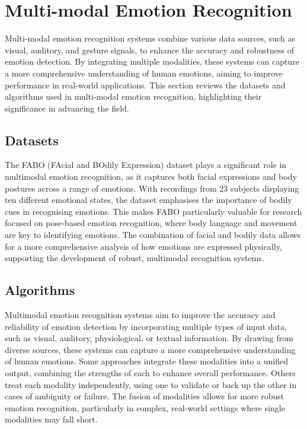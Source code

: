 \section{Multi-modal Emotion Recognition}

Multi-modal emotion recognition systems combine various data sources, such as visual, auditory, and gesture signals, to enhance the accuracy and robustness of emotion detection. By integrating multiple modalities, these systems can capture a more comprehensive understanding of human emotions, aiming to improve performance in real-world applications. This section reviews the datasets and algorithms used in multi-modal emotion recognition, highlighting their significance in advancing the field.

\subsection{Datasets}

The FABO (FAcial and BOdily Expression) dataset \cite{1699093} plays a significant role in multimodal emotion recognition, as it captures both facial expressions and body postures across a range of emotions. With recordings from 23 subjects displaying ten different emotional states, the dataset emphasises the importance of bodily cues in recognising emotions. This makes FABO particularly valuable for research focused on pose-based emotion recognition, where body language and movement are key to identifying emotions. The combination of facial and bodily data allows for a more comprehensive analysis of how emotions are expressed physically, supporting the development of robust, multimodal recognition systems.

\subsection{Algorithms}

Multimodal emotion recognition systems aim to improve the accuracy and reliability of emotion detection by incorporating multiple types of input data, such as visual, auditory, physiological, or textual information. By drawing from diverse sources, these systems can capture a more comprehensive understanding of human emotions. Some approaches integrate these modalities into a unified output, combining the strengths of each to enhance overall performance. Others treat each modality independently, using one to validate or back up the other in cases of ambiguity or failure. The fusion of modalities allows for more robust emotion recognition, particularly in complex, real-world settings where single modalities may fall short.

